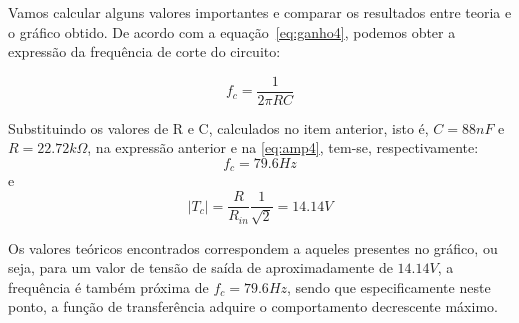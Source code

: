 \documentclass[12pt, a4paper]{article}
\begin{document}
\begin{enumerate}
            Vamos calcular alguns valores importantes e comparar os resultados entre teoria e o gráfico obtido. De acordo com a equação~\ref{eq:ganho4}, podemos obter a expressão da frequência de corte do circuito:
            
            \begin{equation} \label{eq:corte5}              
            f_c = \frac{1}{2 \pi RC}
            \end{equation}
            
            Substituindo os valores de R e C, calculados no item anterior, isto é, \(C=88nF\) e \(R=22.72k\Omega\), na expressão anterior e na \ref{eq:amp4}, tem-se, respectivamente: \[f_c=79.6Hz\] e \[\left|T_c\right| = \frac{R}{R_{in}}\frac{1}{\sqrt{2}}= 14.14V \]
            
            Os valores teóricos encontrados correspondem a aqueles presentes no gráfico, ou seja, para um valor de tensão de saída de aproximadamente de \(14.14V\), a frequência é também próxima de \(f_c = 79.6Hz\), sendo que especificamente neste ponto, a função de transferência adquire o comportamento decrescente máximo. 
            
    \end{enumerate}
\end{document}
